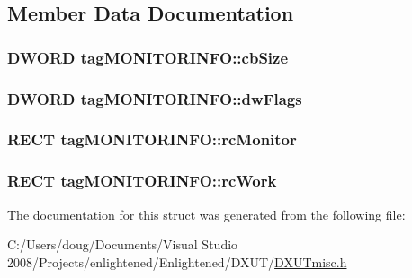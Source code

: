 \subsection{Member Data Documentation}
\hypertarget{structtag_m_o_n_i_t_o_r_i_n_f_o_ae33bcbe159b7f7f4917c0949287acaba}{
\subsubsection[{cbSize}]{\setlength{\rightskip}{0pt plus 5cm}DWORD {\bf tagMONITORINFO::cbSize}}}
\label{structtag_m_o_n_i_t_o_r_i_n_f_o_ae33bcbe159b7f7f4917c0949287acaba}
\hypertarget{structtag_m_o_n_i_t_o_r_i_n_f_o_a7f7a1608179d7bf5b75abc2152fe04de}{
\subsubsection[{dwFlags}]{\setlength{\rightskip}{0pt plus 5cm}DWORD {\bf tagMONITORINFO::dwFlags}}}
\label{structtag_m_o_n_i_t_o_r_i_n_f_o_a7f7a1608179d7bf5b75abc2152fe04de}
\hypertarget{structtag_m_o_n_i_t_o_r_i_n_f_o_a3e7136198a3c55f18014f6b8cc78e37c}{
\subsubsection[{rcMonitor}]{\setlength{\rightskip}{0pt plus 5cm}RECT {\bf tagMONITORINFO::rcMonitor}}}
\label{structtag_m_o_n_i_t_o_r_i_n_f_o_a3e7136198a3c55f18014f6b8cc78e37c}
\hypertarget{structtag_m_o_n_i_t_o_r_i_n_f_o_a6b69929d40dcc1715001f2f3140130a5}{
\subsubsection[{rcWork}]{\setlength{\rightskip}{0pt plus 5cm}RECT {\bf tagMONITORINFO::rcWork}}}
\label{structtag_m_o_n_i_t_o_r_i_n_f_o_a6b69929d40dcc1715001f2f3140130a5}


The documentation for this struct was generated from the following file:\begin{DoxyCompactItemize}
\item 
C:/Users/doug/Documents/Visual Studio 2008/Projects/enlightened/Enlightened/DXUT/\hyperlink{_d_x_u_tmisc_8h}{DXUTmisc.h}\end{DoxyCompactItemize}
